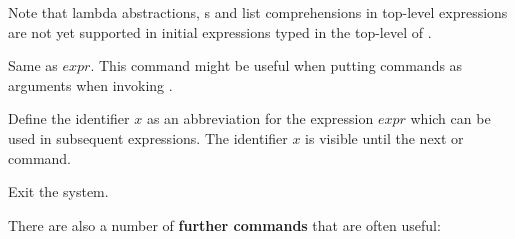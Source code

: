 \begin{description}
Note that lambda abstractions, s and list comprehensions
in top-level expressions are not yet supported in initial expressions
typed in the top-level of \CYS.

\item[\fbox{:eval $expr$}]
Same as $expr$. This command might be useful when putting
commands as arguments when invoking .

\item[\fbox{\code{let} $x$ \code{=} $expr$}]
Define the identifier $x$ as an abbreviation for the expression $expr$
which can be used in subsequent expressions. The identifier $x$
is visible until the next  or  command.

\item[\fbox{\code{:quit}}] Exit the system.
\end{description}
%
\bigskip
%
There are also a number of {\bf further commands} that are often
useful:
%
